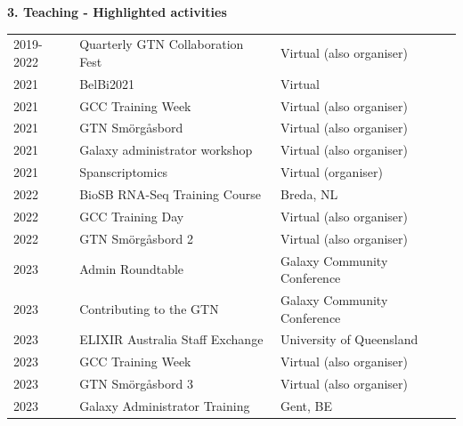 \begin{table}[h!t]
    \textbf{3. Teaching - Highlighted activities} \\

    \begin{tabular}{lll}
        2019-2022 & Quarterly GTN Collaboration Fest & Virtual (also organiser) \\
        2021      & BelBi2021                        & Virtual \\
        2021      & GCC Training Week                & Virtual (also organiser) \\
        2021      & GTN Smörgåsbord                  & Virtual (also organiser) \\
        2021      & Galaxy administrator workshop    & Virtual (also organiser) \\
        2021      & Spanscriptomics                  & Virtual (organiser) \\
        2022      & BioSB RNA-Seq  Training Course   & Breda, NL \\
        2022      & GCC Training Day                 & Virtual (also organiser) \\
        2022      & GTN Smörgåsbord 2                & Virtual (also organiser) \\
        2023      & Admin Roundtable                 & Galaxy Community Conference \\
        2023      & Contributing to the GTN          & Galaxy Community Conference \\
        2023      & ELIXIR Australia Staff Exchange  & University of Queensland \\
        2023      & GCC Training Week                & Virtual (also organiser) \\
        2023      & GTN Smörgåsbord 3                & Virtual (also organiser) \\
        2023      & Galaxy Administrator Training    & Gent, BE \\


    \end{tabular}
\end{table}

